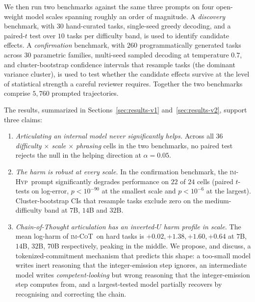 \documentclass[11pt]{article}
\newcommand{\imhyp}{\textsc{im-Hyp}}
\newcommand{\imcot}{\textsc{im-CoT}}
\begin{document}
We then run two benchmarks against the same three prompts on four
open-weight model scales spanning roughly an order of magnitude.
A \emph{discovery} benchmark, with $30$ hand-curated tasks,
single-seed greedy decoding, and a paired-$t$ test over $10$ tasks
per difficulty band, is used to identify candidate effects.
A \emph{confirmation} benchmark, with $260$ programmatically
generated tasks across $30$ parametric families, multi-seed sampled
decoding at temperature $0.7$, and cluster-bootstrap confidence
intervals that resample tasks (the dominant variance cluster), is
used to test whether the candidate effects survive at the level of
statistical strength a careful reviewer requires.  Together the two
benchmarks comprise $5{,}760$ prompted trajectories.

The results, summarized in Sections~\ref{sec:results-v1}
and~\ref{sec:results-v2}, support three claims:

\begin{enumerate}[leftmargin=2em,itemsep=2pt,topsep=2pt]
\item \emph{Articulating an internal model never significantly
  helps.}  Across all $36$ \emph{difficulty $\times$ scale $\times$
  phrasing} cells in the two benchmarks, no paired test rejects
  the null in the helping direction at $\alpha = 0.05$.

\item \emph{The harm is robust at every scale.}  In the
  confirmation benchmark, the \imhyp\ prompt significantly
  degrades performance on $22$ of $24$ cells (paired $t$-tests on
  log-error, $p < 10^{-90}$ at the smallest scale and $p < 10^{-6}$
  at the largest).  Cluster-bootstrap CIs that resample tasks
  exclude zero on the medium-difficulty band at $7$B, $14$B and
  $32$B.

\item \emph{Chain-of-Thought articulation has an inverted-$U$ harm
  profile in scale.}  The mean log-harm of \imcot\ on hard tasks
  is $+0.02, +1.38, +1.60, +0.64$ at $7$B, $14$B, $32$B, $70$B
  respectively, peaking in the middle.  We propose, and discuss,
  a tokenized-commitment mechanism that predicts this shape:  a
  too-small model writes inert reasoning that the integer-emission
  step ignores, an intermediate model writes
  \emph{competent-looking} but wrong reasoning that the
  integer-emission step computes from, and a largest-tested model
  partially recovers by recognising and correcting the chain.
\end{enumerate}
\end{document}
